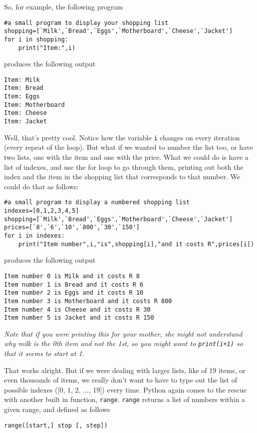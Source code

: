So, for example, the following program
\begin{lstlisting}
#a small program to display your shopping list
shopping=[`Milk',`Bread',`Eggs',`Motherboard',`Cheese',`Jacket']
for i in shopping:
    print("Item:",i)
\end{lstlisting}

produces the following output
\begin{lstlisting}
Item: Milk
Item: Bread
Item: Eggs
Item: Motherboard
Item: Cheese
Item: Jacket
\end{lstlisting}

Well, that's pretty cool. Notice how the variable \texttt{i} changes on every iteration (every repeat of the loop). But what if we wanted to number the list too, or have two lists, one with the item and one with the price. What we could do is have a list of indexes, and use the for loop to go through them, printing out both the index and the item in the shopping list that corresponds to that number. We could do that as follows: 
\begin{lstlisting}
#a small program to display a numbered shopping list
indexes=[0,1,2,3,4,5]
shopping=[`Milk',`Bread',`Eggs',`Motherboard',`Cheese',`Jacket']
prices=[`8',`6',`10',`800',`30',`150']
for i in indexes:
    print("Item number",i,"is",shopping[i],"and it costs R",prices[i])
\end{lstlisting}   produces the following output  
\lstset{keywordstyle=\ttfamily}
\begin{lstlisting}
Item number 0 is Milk and it costs R 8
Item number 1 is Bread and it costs R 6
Item number 2 is Eggs and it costs R 10
Item number 3 is Motherboard and it costs R 800
Item number 4 is Cheese and it costs R 30
Item number 5 is Jacket and it costs R 150
\end{lstlisting}
\lstset{keywordstyle=\textbf}
\textit{Note that if you were printing this for your mother, she might not understand why milk is the 0th item and not the 1st, so you might want to \texttt{print(i+1)} so that it seems to start at 1.}

 That works alright. But if we were dealing with larger lists,   like of 19 items, or even thousands of items, we really don't   want to have to type out the list of possible indexes ([0, 1, 2, ...,   19]) every time. Python again comes to the rescue with another built in   function, \texttt{range}.   \texttt{range} returns a list of numbers within a given range, and defined as   follows
\begin{lstlisting}
range([start,] stop [, step])
\end{lstlisting}

